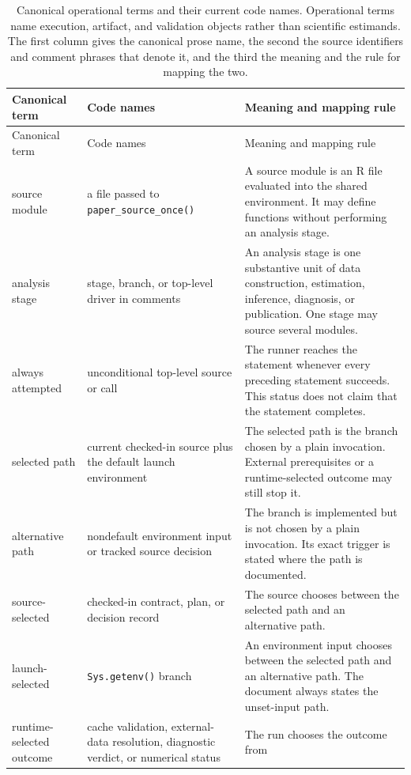 \documentclass[11pt]{article}
\DeclareRobustCommand{\code}[1]{%
  \ifmmode\text{\ttfamily\detokenize{#1}}\else\nolinkurl{#1}\fi}
\begin{document}
\small
\begin{longtable}{@{}>{\raggedright\arraybackslash}p{}
  >{\raggedright\arraybackslash}p{}
  >{\raggedright\arraybackslash}p{}@{}}
\caption{Canonical operational terms and their current code names. Operational terms
name execution, artifact, and validation objects rather than scientific estimands. The
first column gives the canonical prose name, the second the source identifiers and
comment phrases that denote it, and the third the meaning and the rule for mapping the
two.
\label{tab:operational-terms}}\\
\toprule
Canonical term & Code names & Meaning and mapping rule\\
\midrule
\endfirsthead
\toprule
Canonical term & Code names & Meaning and mapping rule\\
\midrule
\endhead
source module & a file passed to \code{paper_source_once()} & A source module is
an R file evaluated into the shared environment. It may define functions
without performing an analysis stage.\\
analysis stage & stage, branch, or top-level driver in comments & An analysis
stage is one substantive unit of data construction, estimation, inference,
diagnosis, or publication. One stage may source several modules.\\
always attempted & unconditional top-level source or call & The runner reaches
the statement whenever every preceding statement succeeds. This status does not
claim that the statement completes.\\
selected path & current checked-in source plus the default launch environment &
The selected path is the branch chosen by a plain invocation. External
prerequisites or a runtime-selected outcome may still stop it.\\
alternative path & nondefault environment input or tracked source decision & The
branch is implemented but is not chosen by a plain invocation. Its exact trigger
is stated where the path is documented.\\
source-selected & checked-in contract, plan, or decision record & The source
chooses between the selected path and an alternative path.\\
launch-selected & \code{Sys.getenv()} branch & An environment input chooses
between the selected path and an alternative path. The document always states
the unset-input path.\\
runtime-selected outcome & cache validation, external-data resolution,
diagnostic verdict, or numerical status & The run chooses the outcome from

\end{longtable}
\end{document}
